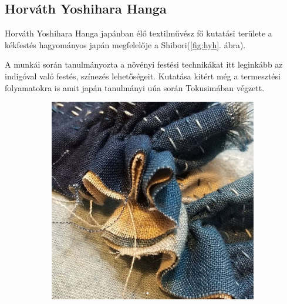 \subsection{Horváth Yoshihara Hanga} 
Horváth Yoshihara Hanga japánban élő textilművész fő kutatási területe \cite{hanga2010} a kékfestés hagyományos japán megfelelője a Shibori(\ref{fig:hyh}. ábra).

A munkái során tanulmányozta a növényi festési technikákat itt leginkább az indigóval való festés, színezés lehetőségeit. Kutatása kitért még a termesztési folyamatokra is amit japán tanulmányi uúa során Tokusimában végzett.

\begin{figure}[h!]
	\centering
	\begin{subfigure}[b]{0.3\linewidth}
	  \includegraphics[width=\linewidth]{img/hh_01.png}
	  \caption{}
	\end{subfigure}
	\begin{subfigure}[b]{0.3\linewidth}

\end{subfigure}
\end{figure}
